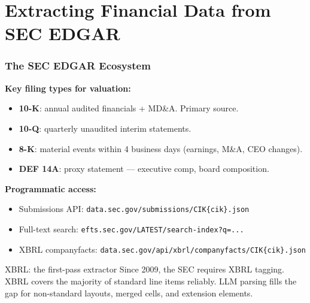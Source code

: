 \documentclass[9pt,t]{beamer}
\begin{document}
\section{Extracting Financial Data from SEC EDGAR}

\begin{frame}
\frametitle{The SEC EDGAR Ecosystem}

\textbf{Key filing types for valuation:}
\begin{itemize}
  \item \textbf{10-K}: annual audited financials + MD\&A. Primary source.
  \item \textbf{10-Q}: quarterly unaudited interim statements.
  \item \textbf{8-K}: material events within 4 business days (earnings, M\&A, CEO changes).
  \item \textbf{DEF 14A}: proxy statement --- executive comp, board composition.
\end{itemize}

\medskip
\textbf{Programmatic access:}
\begin{itemize}
  \item Submissions API: \texttt{data.sec.gov/submissions/CIK\{cik\}.json}
  \item Full-text search: \texttt{efts.sec.gov/LATEST/search-index?q=...}
  \item XBRL companyfacts: \texttt{data.sec.gov/api/xbrl/companyfacts/CIK\{cik\}.json}
\end{itemize}

\medskip
\begin{block}{XBRL: the first-pass extractor}
Since 2009, the SEC requires XBRL tagging. XBRL covers the majority of standard line items reliably.
LLM parsing fills the gap for non-standard layouts, merged cells, and extension elements.
\end{block}
\end{frame}
\end{document}
